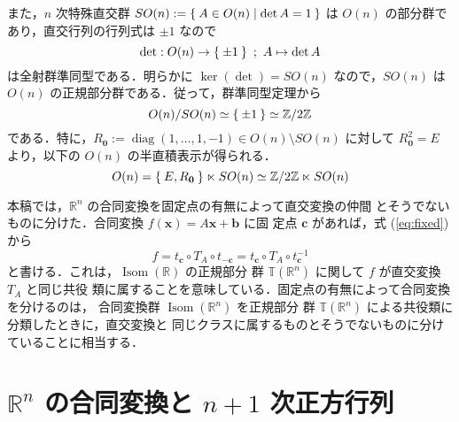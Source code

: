 \documentclass[11pt, uplatex, dvipdfmx, titlepage]{jsarticle}
\DeclareMathOperator{\Isom}{Isom}
\DeclareMathOperator{\diag}{diag}
\theoremstyle{definition}
\begin{document}
また，$n$ 次特殊直交群 $SO(n):=\Set{A \in O(n) | \det
  A=1}$ は $O(n)$ の部分群であり，直交行列の行列式は $\pm 1$ なので
\[
  \det : O(n) \to \Set{\pm 1} \ ; \ A \mapsto \det A
\]
は全射群準同型である．明らかに $\ker (\det) = SO(n)$ なので，$SO(n)$
は $O(n)$ の正規部分群である．従って，群準同型定理から
\[
  O(n)/SO(n) \simeq \Set{\pm 1} \simeq \mathbb{Z}/2\mathbb{Z}
\]
である．特に，$R_{\bm{0}}:=\diag(1,\ldots, 1, -1) \in O(n) \setminus
SO(n)$ に対して $R_{\bm{0}}^2 =E$ より，以下の $O(n)$ の半直積表示が得られる．
\[
  O(n) = \Set{E, R_{\bm{0}}} \ltimes SO(n) \simeq  \mathbb{Z}/2\mathbb{Z} \ltimes SO(n)
\]

本稿では，$\mathbb{R}^n$ の合同変換を固定点の有無によって直交変換の仲間
とそうでないものに分けた．合同変換 $f(\bm{x}) = A\bm{x} + \bm{b}$ に固
定点 $\bm{c}$ があれば，式 (\ref{eq:fixed})から
\[
  f = t_{\bm{c}} \circ T_A \circ t_{-\bm{c}} = t_{\bm{c}} \circ T_A \circ t_{\bm{c}}^{-1}
\]
と書ける．これは，$\Isom(\mathbb{R})$ の正規部分
群 $\mathbb{T}(\mathbb{R}^n)$ に関して $f$ が直交変換 $T_A$ と同じ共役
類に属することを意味している．固定点の有無によって合同変換を分けるのは，
合同変換群 $\Isom(\mathbb{R}^n)$ を正規部分
群 $\mathbb{T}(\mathbb{R}^n)$ による共役類に分類したときに，直交変換と
同じクラスに属するものとそうでないものに分けていることに相当する．

\section{$\mathbb{R}^n$ の合同変換と $n+1$ 次正方行列}\label{sec:matrix}
\end{document}
